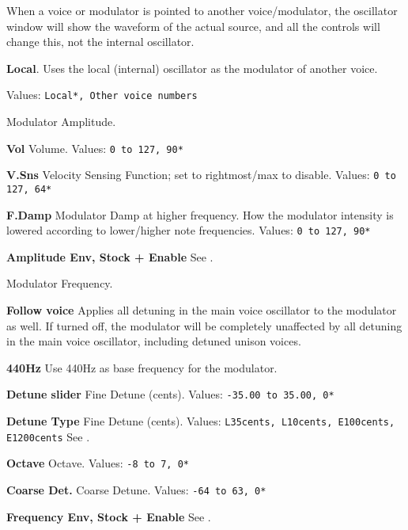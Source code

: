    When a voice or modulator is pointed to another voice/modulator, the
   oscillator window will show the waveform of the actual source, and all the
   controls will change this, not the internal oscillator.

   \textbf{Local}.
   Uses the local (internal) oscillator as the modulator of another voice.

   Values: \texttt{Local*, Other voice numbers}

   Modulator Amplitude.

   \begin{enumber}
      \item \textbf{Vol}
         Volume.
         Values: \texttt{0 to 127, 90*}
      \item \textbf{V.Sns}
         Velocity Sensing Function; set to rightmost/max to disable.
         Values: \texttt{0 to 127, 64*}
      \item \textbf{F.Damp}
         Modulator Damp at higher frequency.
         How the modulator intensity is lowered according to lower/higher
         note frequencies.
         Values: \texttt{0 to 127, 90*}
      \item \textbf{Amplitude Env, Stock + Enable}
         See .
   \end{enumber}

   Modulator Frequency.


   \begin{enumber}
     \item \textbf{Follow voice}
        Applies all detuning in the main voice oscillator to the modulator as
        well. If turned off, the modulator will be completely unaffected by all
        detuning in the main voice oscillator, including detuned unison voices.
     \item \textbf{440Hz}
        Use 440Hz as base frequency for the modulator.
      \item \textbf{Detune slider}
         Fine Detune (cents).
         Values: \texttt{-35.00 to 35.00, 0*}
      \item \textbf{Detune Type}
         Fine Detune (cents).
         Values: \texttt{L35cents, L10cents, E100cents, E1200cents}
         See .
      \item \textbf{Octave}
         Octave.
         Values: \texttt{-8 to 7, 0*}
      \item \textbf{Coarse Det.}
         Coarse Detune.
         Values: \texttt{-64 to 63, 0*}
      \item \textbf{Frequency Env, Stock + Enable}
         See .
   \end{enumber}

